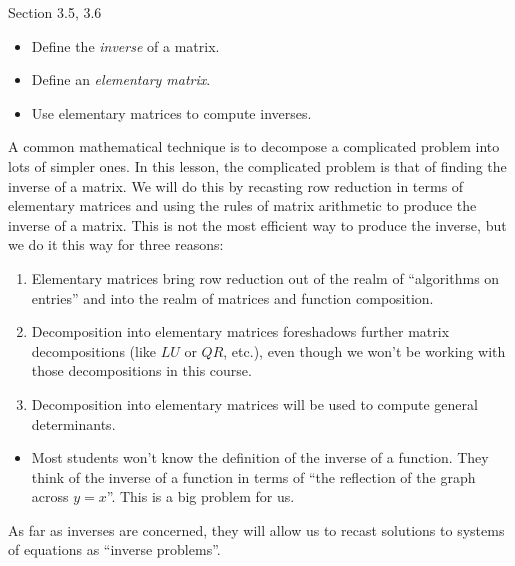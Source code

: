 \documentclass{problemset}
\begin{document}
\begin{lesson}

	Section 3.5, 3.6

	\begin{itemize}
		\item Define the \emph{inverse} of a matrix.
		\item Define an \emph{elementary matrix}.
		\item Use elementary matrices to compute inverses.
	\end{itemize}

	A common mathematical technique is to decompose a complicated problem into lots of simpler ones.
	In this lesson, the complicated problem is that of finding the inverse of a matrix. We will do this
	by recasting row reduction in terms of elementary matrices and using the rules of matrix arithmetic
	to produce the inverse of a matrix. This is not the most efficient way to produce the inverse, but we
	do it this way for three reasons:
	\begin{enumerate}
		\item Elementary matrices bring row reduction out of the realm of ``algorithms on entries'' and into
			the realm of matrices and function composition.
		\item Decomposition into elementary matrices foreshadows further matrix decompositions (like $LU$ or $QR$, etc.),
			even though we won't be working with those decompositions in this course.
		\item Decomposition into elementary matrices will be used to compute general determinants.
	\end{enumerate}


	\begin{annotation}
		\begin{notes}
			\begin{itemize}
				\item Most students won't know the definition of the inverse of a function.
					They think of the inverse of a function in terms of ``the reflection of the graph
					across $y=x$''. This is a big problem for us.
			\end{itemize}
		\end{notes}
	\end{annotation}
	As far as inverses are concerned, they will allow us to recast solutions to systems of equations as ``inverse problems''.


\end{lesson}
\end{document}
